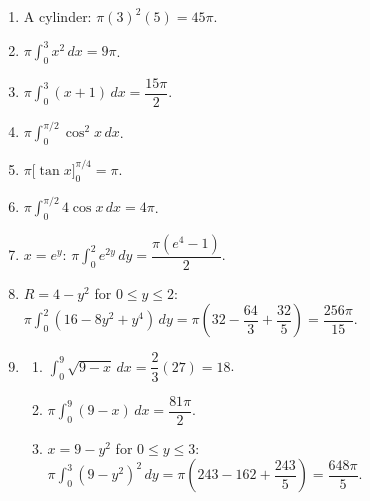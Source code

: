 \documentclass[11pt]{article}
\begin{document}
\newpage
\begin{solbox}
\begin{enumerate}[leftmargin=*,itemsep=4pt]
  \item A cylinder: $\pi(3)^2(5)=45\pi$.
  \item $\pi\displaystyle\int_{0}^{3}x^2\,dx=9\pi$.
  \item $\pi\displaystyle\int_{0}^{3}(x+1)\,dx=\dfrac{15\pi}{2}$.
  \item $\pi\displaystyle\int_{0}^{\pi/2}\cos^2x\,dx$.
  \item $\pi\Big[\tan x\Big]_0^{\pi/4}=\pi$.
  \item $\pi\displaystyle\int_{0}^{\pi/2}4\cos x\,dx=4\pi$.
  \item $x=e^{y}$: $\pi\displaystyle\int_{0}^{2}e^{2y}\,dy=\dfrac{\pi(e^4-1)}{2}$.
  \item $R=4-y^2$ for $0\le y\le2$: $\pi\displaystyle\int_{0}^{2}(16-8y^2+y^4)\,dy=\pi\left(32-\dfrac{64}{3}+\dfrac{32}{5}\right)=\dfrac{256\pi}{15}$.
  \item \begin{enumerate}[label=(\alph*),leftmargin=*,itemsep=3pt]
    \item $\displaystyle\int_{0}^{9}\sqrt{9-x}\,dx=\dfrac23(27)=18$.
    \item $\pi\displaystyle\int_{0}^{9}(9-x)\,dx=\dfrac{81\pi}{2}$.
    \item $x=9-y^2$ for $0\le y\le3$: $\pi\displaystyle\int_{0}^{3}(9-y^2)^2\,dy=\pi\left(243-162+\dfrac{243}{5}\right)=\dfrac{648\pi}{5}$.
  \end{enumerate}
\end{enumerate}
\end{solbox}
\end{document}
